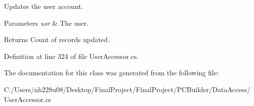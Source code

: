 Updates the user account. 


\begin{DoxyParams}{Parameters}
{\em usr} & The user.\\
\hline
\end{DoxyParams}
\begin{DoxyReturn}{Returns}
Count of records updated.
\end{DoxyReturn}


Definition at line 324 of file User\+Accessor.\+cs.



The documentation for this class was generated from the following file\+:\begin{DoxyCompactItemize}
\item 
C\+:/\+Users/nh228u08/\+Desktop/\+Final\+Project/\+Final\+Project/\+P\+C\+Builder/\+Data\+Access/User\+Accessor.\+cs\end{DoxyCompactItemize}
